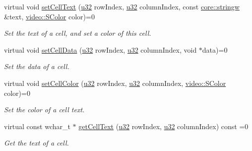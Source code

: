 \begin{DoxyCompactItemize}
virtual void \hyperlink{classirr_1_1gui_1_1IGUITable_ab23ea414e2a01dd8ed8b3ab659318653}{set\+Cell\+Text} (\hyperlink{namespaceirr_a0416a53257075833e7002efd0a18e804}{u32} row\+Index, \hyperlink{namespaceirr_a0416a53257075833e7002efd0a18e804}{u32} column\+Index, const \hyperlink{namespaceirr_1_1core_a5aedb62cb47cf01d1c548ab5e6344d2d}{core\+::stringw} \&text, \hyperlink{classirr_1_1video_1_1SColor}{video\+::\+S\+Color} color)=0
\begin{DoxyCompactList}\small\item\em Set the text of a cell, and set a color of this cell. \end{DoxyCompactList}\item 
\mbox{\label{classirr_1_1gui_1_1IGUITable_a88ddb4a8f63fd42a823b7f9363b9b877}} 
virtual void \hyperlink{classirr_1_1gui_1_1IGUITable_a88ddb4a8f63fd42a823b7f9363b9b877}{set\+Cell\+Data} (\hyperlink{namespaceirr_a0416a53257075833e7002efd0a18e804}{u32} row\+Index, \hyperlink{namespaceirr_a0416a53257075833e7002efd0a18e804}{u32} column\+Index, void $\ast$data)=0
\begin{DoxyCompactList}\small\item\em Set the data of a cell. \end{DoxyCompactList}\item 
\mbox{\label{classirr_1_1gui_1_1IGUITable_abc650141a64f7e9f61cc5f8521b51ab4}} 
virtual void \hyperlink{classirr_1_1gui_1_1IGUITable_abc650141a64f7e9f61cc5f8521b51ab4}{set\+Cell\+Color} (\hyperlink{namespaceirr_a0416a53257075833e7002efd0a18e804}{u32} row\+Index, \hyperlink{namespaceirr_a0416a53257075833e7002efd0a18e804}{u32} column\+Index, \hyperlink{classirr_1_1video_1_1SColor}{video\+::\+S\+Color} color)=0
\begin{DoxyCompactList}\small\item\em Set the color of a cell text. \end{DoxyCompactList}\item 
\mbox{\label{classirr_1_1gui_1_1IGUITable_a73ee7498cab65b75dafc60e0deb8c85b}} 
virtual const wchar\+\_\+t $\ast$ \hyperlink{classirr_1_1gui_1_1IGUITable_a73ee7498cab65b75dafc60e0deb8c85b}{get\+Cell\+Text} (\hyperlink{namespaceirr_a0416a53257075833e7002efd0a18e804}{u32} row\+Index, \hyperlink{namespaceirr_a0416a53257075833e7002efd0a18e804}{u32} column\+Index) const =0
\begin{DoxyCompactList}\small\item\em Get the text of a cell. \end{DoxyCompactList}\item 

\end{DoxyCompactItemize}
